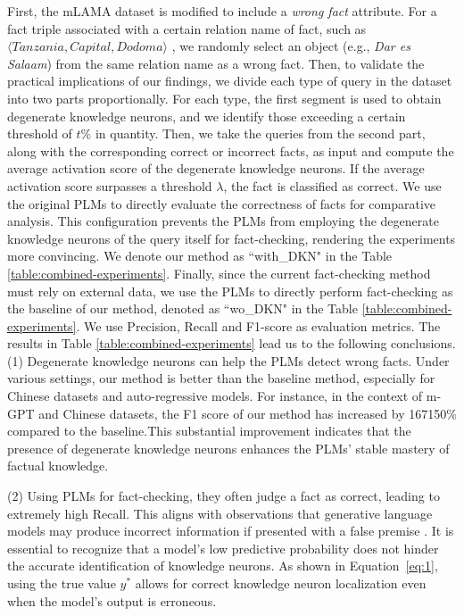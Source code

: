 \documentclass[]{article}
\begin{document}
First, the mLAMA dataset is modified to include a \textit{wrong fact} attribute.
For a fact triple associated with a certain relation name of fact, such as $\langle \textit{Tanzania}, \textit{Capital}, \textit{Dodoma} \rangle$ , we randomly select an object (e.g., \textit{Dar es Salaam}) from the same relation name as a wrong fact.
Then, to validate the practical implications of our findings, we divide each type of query in the dataset into two parts proportionally. For each type, the first segment is used to obtain degenerate knowledge neurons, and we identify those exceeding a certain threshold of \( t\% \) in quantity.
Then, we take the queries from the second part, along with the corresponding correct or incorrect facts, as input and compute the average activation score of the degenerate knowledge neurons. If the average activation score surpasses a threshold $\lambda$, the fact is classified as correct.
We use the original PLMs to directly evaluate the correctness of facts for comparative analysis. This configuration prevents the PLMs from employing the degenerate knowledge neurons of the query itself for fact-checking, rendering the experiments more convincing. We denote our method as ``with\_DKN" in the Table \ref{table:combined-experiments}.
Finally, since the current fact-checking method must rely on external data, we use the PLMs to directly perform fact-checking as the baseline of our method, denoted as ``wo\_DKN" in the Table \ref{table:combined-experiments}. We use Precision, Recall and F1-score as evaluation metrics.  The results in Table \ref{table:combined-experiments} lead us to the following conclusions.  (1) Degenerate knowledge neurons can help the PLMs detect wrong facts. Under various settings, our method is better than the baseline method, especially for Chinese datasets and auto-regressive models. For instance, in the context of m-GPT and Chinese datasets, the F1 score of our method has increased by 167150\% compared to the baseline.This substantial improvement indicates that the presence of degenerate knowledge neurons enhances the PLMs' stable mastery of factual knowledge.

(2) Using PLMs for fact-checking, they often judge a fact as correct, leading to extremely high Recall. This aligns with observations that generative language models may produce incorrect information if presented with a false premise \cite{hallucination_chatgpt3, lakshmanan2022large, metz2022new}.
It is essential to recognize that a model's low predictive probability does not hinder the accurate identification of knowledge neurons. As shown in Equation~\ref{eq:1}, using the true value \( y^* \) allows for correct knowledge neuron localization even when the model's output is erroneous.
\end{document}
